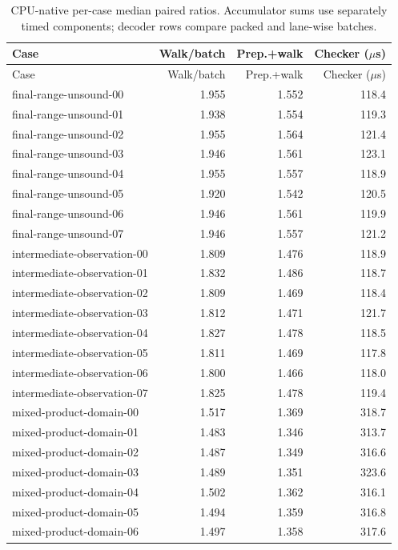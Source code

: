 {\small
\begin{longtable}{lrrr}
\caption{CPU-native per-case median paired ratios. Accumulator sums use separately timed components; decoder rows compare packed and lane-wise batches.}\label{tab:native-all}\\
\toprule Case & Walk/batch & Prep.+walk & Checker ($\mu$s) \\
\midrule\endfirsthead
\toprule Case & Walk/batch & Prep.+walk & Checker ($\mu$s) \\ \midrule\endhead
final-range-unsound-00 & 1.955 & 1.552 & 118.4 \\
final-range-unsound-01 & 1.938 & 1.554 & 119.3 \\
final-range-unsound-02 & 1.955 & 1.564 & 121.4 \\
final-range-unsound-03 & 1.946 & 1.561 & 123.1 \\
final-range-unsound-04 & 1.955 & 1.557 & 118.9 \\
final-range-unsound-05 & 1.920 & 1.542 & 120.5 \\
final-range-unsound-06 & 1.946 & 1.561 & 119.9 \\
final-range-unsound-07 & 1.946 & 1.557 & 121.2 \\
intermediate-observation-00 & 1.809 & 1.476 & 118.9 \\
intermediate-observation-01 & 1.832 & 1.486 & 118.7 \\
intermediate-observation-02 & 1.809 & 1.469 & 118.4 \\
intermediate-observation-03 & 1.812 & 1.471 & 121.7 \\
intermediate-observation-04 & 1.827 & 1.478 & 118.5 \\
intermediate-observation-05 & 1.811 & 1.469 & 117.8 \\
intermediate-observation-06 & 1.800 & 1.466 & 118.0 \\
intermediate-observation-07 & 1.825 & 1.478 & 119.4 \\
mixed-product-domain-00 & 1.517 & 1.369 & 318.7 \\
mixed-product-domain-01 & 1.483 & 1.346 & 313.7 \\
mixed-product-domain-02 & 1.487 & 1.349 & 316.6 \\
mixed-product-domain-03 & 1.489 & 1.351 & 323.6 \\
mixed-product-domain-04 & 1.502 & 1.362 & 316.1 \\
mixed-product-domain-05 & 1.494 & 1.359 & 316.8 \\
mixed-product-domain-06 & 1.497 & 1.358 & 317.6 \\

\end{longtable}}
